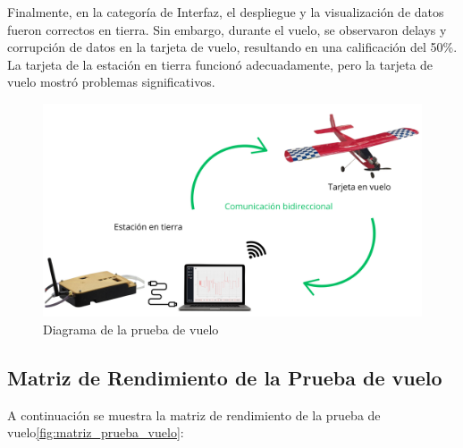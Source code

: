         Finalmente, en la categoría de Interfaz, el despliegue y la visualización de datos fueron correctos en tierra. Sin embargo, durante el vuelo, se observaron delays y corrupción de datos en la tarjeta de vuelo, resultando en una calificación del 50\%. La tarjeta de la estación en tierra funcionó adecuadamente, pero la tarjeta de vuelo mostró problemas significativos.\\
        \begin{figure}[H]
            \centering
            \includegraphics[width=12  cm]{Imagenes/Pruebas/Esquematico.png}
            \caption{Diagrama de la prueba de vuelo}
            \label{fig:diagrama_prueba_vuelo}
        \end{figure}


    \clearpage
    \subsection{Matriz de Rendimiento de la Prueba de vuelo}
        A continuación se muestra la matriz de rendimiento de la prueba de vuelo\ref{fig:matriz_prueba_vuelo}:

